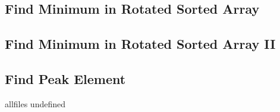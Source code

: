 \documentclass{article}
\begin{document}
\begin{CJK}{UTF8}{gbsn}
\subsection{Find Minimum in Rotated Sorted Array}

\subsection{Find Minimum in Rotated Sorted Array II}

\subsection{Find Peak Element}


\ifx allfiles undefined
\end{CJK}
\end{document}
